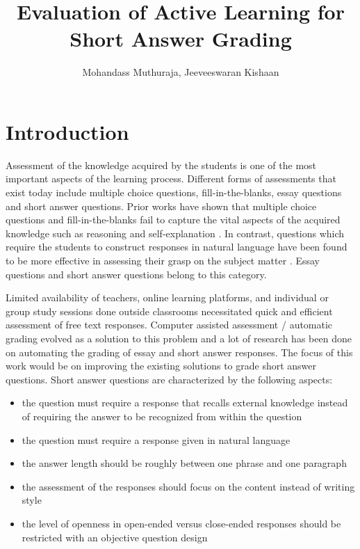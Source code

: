 \documentclass[rnd]{mas_proposal}
\title{Evaluation of Active Learning for Short Answer Grading}
\author{Mohandass Muthuraja, Jeeveeswaran Kishaan}
\begin{document}
\maketitle

\pagestyle{plain}

\chapter{Introduction}

\vspace{4mm}
 
Assessment of the knowledge acquired by the students is one of the most important aspects of the learning process. Different forms of assessments that exist today include multiple choice questions, fill-in-the-blanks, essay questions and short answer questions. Prior works have shown that multiple choice questions and fill-in-the-blanks fail to capture the vital aspects of the acquired knowledge such as reasoning and self-explanation \cite{Wang2008}. In contrast, questions which require the students to construct responses in natural language have been found to be more effective in assessing their grasp on the subject matter \cite{Roy2016a}. Essay questions and short answer questions belong to this category.  

\vspace{4mm}

Limited availability of teachers, online learning platforms, and individual or group study sessions done outside classrooms necessitated quick and efficient assessment of free text responses. Computer assisted assessment / automatic grading evolved as a solution to this problem and a lot of research has been done on automating the grading of essay\cite{Higgins2004} and short answer responses\cite{Leacock2003, Pulman2005, Mohler2009}. The focus of this work would be on improving the existing solutions to grade short answer questions. Short answer questions are characterized by the following aspects\cite{Burrows2015}:

\begin{itemize}

\item the question must require a response that recalls external knowledge instead of requiring the answer to be recognized from within the question

\item the question must require a response given in natural language

\item the answer length should be roughly between one phrase and one paragraph

\item the assessment of the responses should focus on the content instead of writing style

\item the level of openness in open-ended versus close-ended responses should be restricted with an objective question design 

\end{itemize}
\end{document}
